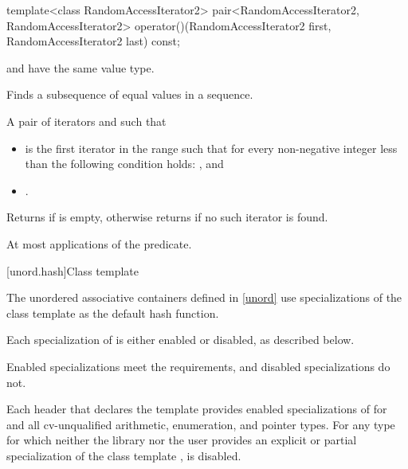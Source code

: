 %
\begin{itemdecl}
template<class RandomAccessIterator2>
  pair<RandomAccessIterator2, RandomAccessIterator2>
    operator()(RandomAccessIterator2 first, RandomAccessIterator2 last) const;
\end{itemdecl}

\begin{itemdescr}
\pnum
\mandates
{} and 
have the same value type.

\pnum
\effects
Finds a subsequence of equal values in a sequence.

\pnum
\returns
A pair of iterators  and  such that
\begin{itemize}
\item {} is the first iterator  in the range
 such that
for every non-negative integer  less than 
the following condition holds:
, and
\item {}.
\end{itemize}
Returns  if  is empty,
otherwise returns  if no such iterator is found.

\pnum
\complexity
At most  applications of the predicate.
\end{itemdescr}

[unord.hash]{Class template }

\pnum
{}%
%
The unordered associative containers defined in \ref{unord} use
specializations of the class template 
as the default hash function.

\pnum
Each specialization of  is either enabled or disabled,
as described below.
\begin{note}
Enabled specializations meet the  requirements, and
disabled specializations do not.
\end{note}
Each header that declares the template 
provides enabled specializations of  for  and
all cv-unqualified arithmetic, enumeration, and pointer types.
For any type  for which neither the library nor the user provides
an explicit or partial specialization of the class template ,
 is disabled.

